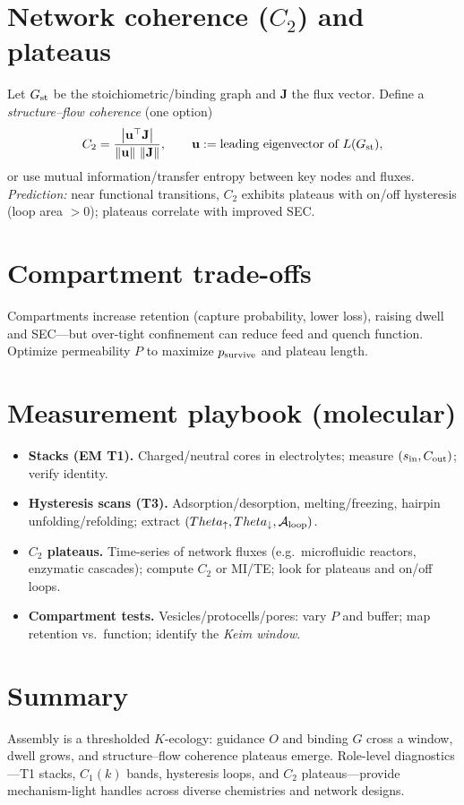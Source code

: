 \documentclass[12pt,a4paper,oneside]{scrreprt}
\def\Theta{Theta}%
\begin{document}
\section{Network coherence ($C_2$) and plateaus}\label{sec:network-coherence}
Let $G_{\rm st}$ be the stoichiometric/binding graph and $\mathbf J$ the flux vector. Define a \emph{structure–flow coherence} (one option)
\[
C_2=\frac{\left|\mathbf u^\top \mathbf J\right|}{\|\mathbf u\|\ \|\mathbf J\|},\qquad 
\mathbf u:=\text{leading eigenvector of }L(G_{\rm st}),
\]
or use mutual information/transfer entropy between key nodes and fluxes. \emph{Prediction:} near functional transitions, $C_2$ exhibits plateaus with on/off hysteresis (loop area $>0$); plateaus correlate with improved SEC.

\section{Compartment trade-offs}\label{sec:compartments}
Compartments increase retention (capture probability, lower loss), raising dwell and SEC—but over-tight confinement can reduce feed and quench function. Optimize permeability $P$ to maximize $p_{\rm survive}$ and plateau length.

\section{Measurement playbook (molecular)}\label{sec:molecular-playbook}
\begin{itemize}
\item \textbf{Stacks (EM T1).} Charged/neutral cores in electrolytes; measure $(s_{\rm in}, C_{\rm out})$; verify identity.
\item \textbf{Hysteresis scans (T3).} Adsorption/desorption, melting/freezing, hairpin unfolding/refolding; extract $(\Theta_\uparrow,\Theta_\downarrow,\mathcal A_{\rm loop})$.
\item \textbf{$C_2$ plateaus.} Time-series of network fluxes (e.g.\ microfluidic reactors, enzymatic cascades); compute $C_2$ or MI/TE; look for plateaus and on/off loops.
\item \textbf{Compartment tests.} Vesicles/protocells/pores: vary $P$ and buffer; map retention vs.\ function; identify the \emph{Keim window}.
\end{itemize}

\section*{Summary}
Assembly is a thresholded $K$-ecology: guidance $O$ and binding $G$ cross a window, dwell grows, and structure–flow coherence plateaus emerge. Role-level diagnostics—T1 stacks, $C_1(k)$ bands, hysteresis loops, and $C_2$ plateaus—provide mechanism-light handles across diverse chemistries and network designs.
\end{document}
